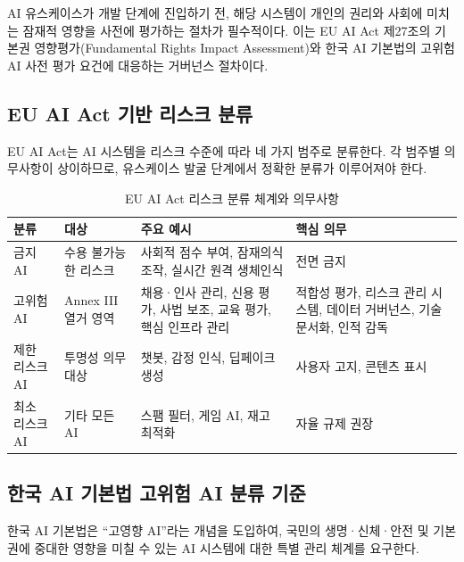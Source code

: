 AI 유스케이스가 개발 단계에 진입하기 전, 해당 시스템이 개인의 권리와 사회에 미치는 잠재적 영향을 사전에 평가하는 절차가 필수적이다. 이는 EU AI Act 제27조의 기본권 영향평가(Fundamental Rights Impact Assessment)와 한국 AI 기본법의 고위험 AI 사전 평가 요건에 대응하는 거버넌스 절차이다.

\subsection{EU AI Act 기반 리스크 분류}
\label{sec:8.3.1}

EU AI Act는 AI 시스템을 리스크 수준에 따라 네 가지 범주로 분류한다. 각 범주별 의무사항이 상이하므로, 유스케이스 발굴 단계에서 정확한 분류가 이루어져야 한다.

\begin{table}[htbp]
\centering
\caption{EU AI Act 리스크 분류 체계와 의무사항}
\label{tab:eu_ai_act_risk}
\begin{tabularx}{\textwidth}{p{2cm}p{3.5cm}Xp{3cm}}
\toprule
\textbf{분류} & \textbf{대상} & \textbf{주요 예시} & \textbf{핵심 의무} \\
\midrule
금지 AI & 수용 불가능한 리스크 & 사회적 점수 부여, 잠재의식 조작, 실시간 원격 생체인식 & 전면 금지 \\
\midrule
고위험 AI & Annex III 열거 영역 & 채용·인사 관리, 신용 평가, 사법 보조, 교육 평가, 핵심 인프라 관리 & 적합성 평가, 리스크 관리 시스템, 데이터 거버넌스, 기술 문서화, 인적 감독 \\
\midrule
제한 리스크 AI & 투명성 의무 대상 & 챗봇, 감정 인식, 딥페이크 생성 & 사용자 고지, 콘텐츠 표시 \\
\midrule
최소 리스크 AI & 기타 모든 AI & 스팸 필터, 게임 AI, 재고 최적화 & 자율 규제 권장 \\
\bottomrule
\end{tabularx}
\end{table}

\subsection{한국 AI 기본법 고위험 AI 분류 기준}
\label{sec:8.3.2}

한국 AI 기본법은 ``고영향 AI''라는 개념을 도입하여, 국민의 생명·신체·안전 및 기본권에 중대한 영향을 미칠 수 있는 AI 시스템에 대한 특별 관리 체계를 요구한다.

